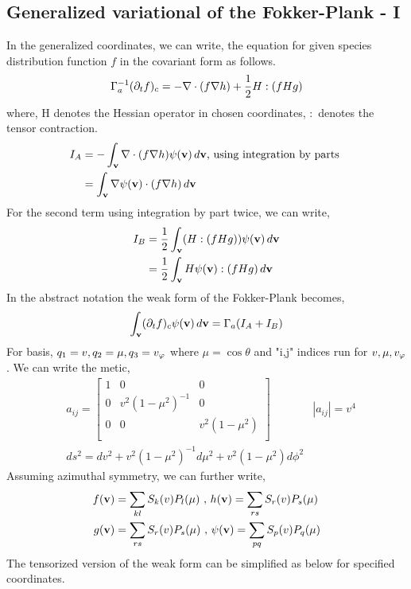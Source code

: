 \documentclass{article}[draft]
\begin{document}
\subsection*{Generalized variational of the Fokker-Plank - I}
In the generalized coordinates, we can write, the equation for given species distribution function $f$ in the covariant form as follows.
\begin{align*}
	\Gamma_a ^{-1} (\partial_t f)_{c} = -\nabla \cdot (f \nabla h ) + \frac{1}{2} H : \of{f H g} 
\end{align*} where, H denotes the Hessian operator in chosen coordinates, $:$ denotes the tensor contraction.  
\begin{align*}
	I_A &= -\int_{\vect{v}}\nabla \cdot (f \nabla h ) \psi\of{\vect{v}} \diff{\vect{v}} \text{, using integration by parts }\\
	& = \int_{\vect{v}} \nabla \psi\of{\vect{v}} \cdot (f \nabla h ) \diff{\vect{v}} 
\end{align*}
For the second term using integration by part twice, we can write, 
\begin{align*}
	I_B &= \frac{1}{2} \int_{\vect{v}} (H : \of{f H g}) \psi\of{\vect{v}} \diff{\vect{v}} \\
	& = \frac{1}{2} \int_{\vect{v}} H\psi\of{\vect{v}} : \of{f H g} \diff{\vect{v}} 
\end{align*}
In the abstract notation the weak form of the Fokker-Plank becomes, 
\begin{align*}
	\int_{\vect{v}} (\partial_t f)_c \psi\of{\vect{v}} \diff{\vect{v}} = \Gamma_a (I_A + I_B)
\end{align*}
For basis, $q_1 = v, q_2 = \mu, q_3 = v_{\varphi}$ where $\mu=\cos\theta$ and "i,j" indices run for $v, \mu, v_{\varphi}$. We can write the metic, 
\begin{align*}
	&a_{ij}=\begin{bmatrix}
		1 & 0 & 0\\
		0 & v^2(1-\mu^2)^{-1} & 0\\
		0 & 0 & v^2(1-\mu^2)\\			
	\end{bmatrix} 
	&|a_{ij}| = v^4 \\
	&ds^2   = dv^2 + v^2(1-\mu^2)^{-1} d\mu^2 + v^2(1-\mu^2) d\phi^2 
\end{align*}
Assuming azimuthal symmetry, we can further write,
\begin{align*}
	f\of{\vect{v}}   &= \sum_{kl} S_k(v) P_{l}(\mu) \text{ , }
	h\of{\vect{v}}   = \sum_{rs} S_r(v)  P_{s}(\mu)\\
	g\of{\vect{v}}   &= \sum_{rs} S_r(v) P_{s}(\mu) \text{ , }
	\psi\of{\vect{v}} = \sum_{pq} S_p(v) P_{q}(\mu)
\end{align*} The tensorized version of the weak form can be simplified as below for specified coordinates. 
\end{document}
